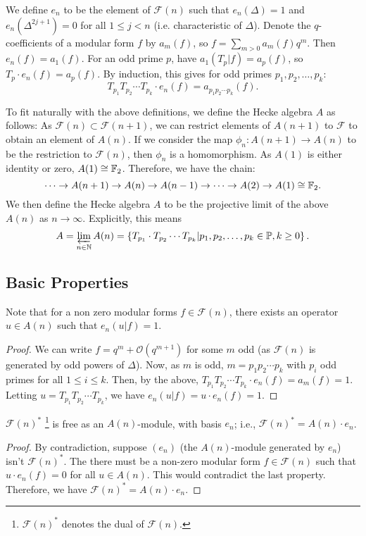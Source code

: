 We define $e_n$ to be the element of $\mathcal{F}(n)$ such that $e_n(\Delta) = 1$ and $e_n(\Delta^{2j+1}) = 0$ for all $1 \leq j <n$ (i.e. characteristic of $\Delta$).
Denote the $q$-coefficients of a modular form $f$ by $a_m(f)$, so $f = \sum_{m>0} a_m(f)q^m$.
Then $e_n(f) = a_1(f)$.
For an odd prime $p$, have $a_1(T_p|f) = a_p(f)$, so $T_p \cdot e_n(f) = a_p(f)$.
By induction, this gives for odd primes $p_1, p_2, \dots, p_k$:
$$
T_{p_1} T_{p_2} \cdots T_{p_k} \cdot e_n(f) 
= a_{p_1 p_2\cdots p_k}(f).
$$

To fit naturally with the above definitions, we define the Hecke algebra $A$ as follows:
As $\mathcal{F}(n) \subset \mathcal{F}(n+1)$, we can restrict elements of $A(n+1)$ to $\mathcal{F}$ to obtain an element of $A(n)$.
If we consider the map $\phi_n: A(n+1) \to A(n)$ to be the restriction to $\mathcal{F}(n)$, then $\phi_n$ is a homomorphism.
As $A(1)$ is either identity or zero, $A(1) \cong \mathbb{F}_2$.
Therefore, we have the chain:
$$
\dots \to A(n+1) \to A(n) \to A(n-1) \to \dots \to A(2) \to A(1) \cong \mathbb{F}_2.
$$
We then define the Hecke algebra $A$ to be the projective limit of the above $A(n)$ as $n \to \infty$.
Explicitly, this means
$$
A = \varprojlim_{n \in \mathbb{N}} A(n) = \left\lbrace T_{p_1} \cdot T_{p_2} \cdots T_{p_k} | p_1, p_2, \dots, p_k \in \mathbb{P}, k\geq 0 \right\rbrace .
$$



\subsection{Basic Properties}

\begin{property}
	Note that for a non zero modular forms $f \in \mathcal{F}(n)$, there exists an operator $u \in A(n)$ such that $e_n(u|f) = 1$.
\end{property}
\begin{proof}
	We can write $f = q^m + \mathcal{O}(q^{m+1})$ for some $m$ odd (as $\mathcal{F}(n)$ is generated by odd powers of $\Delta$).
	Now, as $m$ is odd, $m=p_1 p_2 \cdots p_k$ with $p_i$ odd primes for all $1 \leq i \leq k$.
	Then, by the above, $T_{p_1} T_{p_2} \cdots T_{p_k} \cdot e_n(f) = a_m(f) = 1$.
	Letting $u = T_{p_1} T_{p_2} \cdots T_{p_k}$, we have $e_n(u|f) = u \cdot e_n(f) = 1$.
\end{proof}

\begin{property}
	$\mathcal{F}(n)^*$ \footnote{$\mathcal{F}(n)^*$ denotes the dual of $\mathcal{F}(n)$.} is free as an $A(n)$-module, with basis $e_n$;	
	i.e., $\mathcal{F}(n)^* = A(n) \cdot e_n$.
\end{property}
\begin{proof}
	By contradiction, suppose $(e_n)$ (the $A(n)$-module generated by $e_n$) isn't $\mathcal{F}(n)^*$.
	The there must be a non-zero modular form $f \in \mathcal{F}(n)$ such that $u \cdot e_n(f)=0$ for all $u \in A(n)$.
	This would contradict the last property.
	Therefore, we have $\mathcal{F}(n)^* = A(n) \cdot e_n$.
\end{proof}

